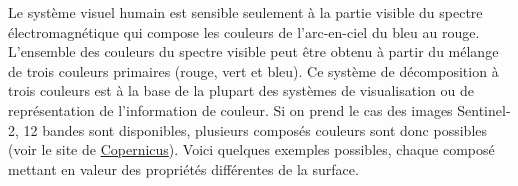 \documentclass[
]{article}
\begin{document}
Le système visuel humain est sensible seulement à la partie visible du
spectre électromagnétique qui compose les couleurs de l'arc-en-ciel du
bleu au rouge. L'ensemble des couleurs du spectre visible peut être
obtenu à partir du mélange de trois couleurs primaires (rouge, vert et
bleu). Ce système de décomposition à trois couleurs est à la base de la
plupart des systèmes de visualisation ou de représentation de
l'information de couleur. Si on prend le cas des images Sentinel-2, 12
bandes sont disponibles, plusieurs composés couleurs sont donc possibles
(voir le site de
\href{https://custom-scripts.sentinel-hub.com/custom-scripts/sentinel-2/composites/}{Copernicus}).
Voici quelques exemples possibles, chaque composé mettant en valeur des
propriétés différentes de la surface.

\label{176ba08d}
\label{cb30}
\end{document}

